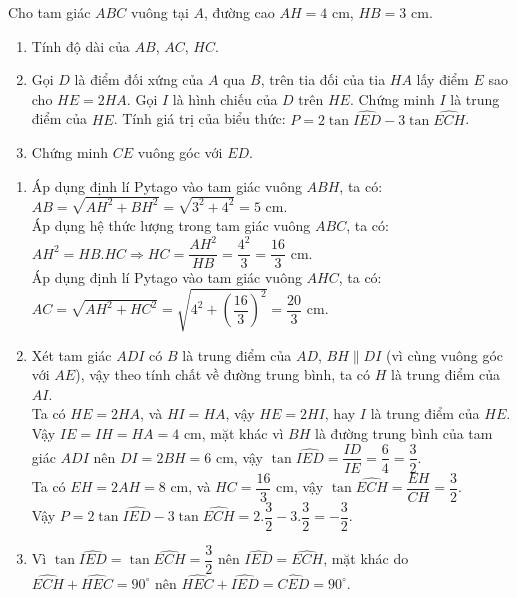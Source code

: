 \begin{ex} %
    Cho tam giác $ABC$ vuông tại $A$, đường cao $AH=4$ cm, $HB=3$ cm.
    \begin{enumerate}
        \item Tính độ dài của $AB$, $AC$, $HC$.
        \item Gọi $D$ là điểm đối xứng của $A$ qua $B$, trên tia đối của tia $HA$ lấy điểm $E$ sao cho $HE=2HA$. Gọi $I$ là hình chiếu của $D$ trên $HE$. Chứng minh $I$ là trung điểm của $HE$. Tính giá trị của biểu thức: $P=2\tan \widehat{IED}-3\tan \widehat{ECH}$.
        \item Chứng minh $CE$ vuông góc với $ED$.
    \end{enumerate}
\loigiai
    {
    \begin{enumerate}
        \item 
\immini
{      
        Áp dụng định lí Pytago vào tam giác vuông $ABH$, ta có:\\ $AB=\sqrt{AH^2+BH^2}=\sqrt{3^2+4^2}=5$ cm.\\
        Áp dụng hệ thức lượng trong tam giác vuông $ABC$, ta có:\\
        $AH^2=HB.HC\Rightarrow HC=\dfrac{AH^2}{HB}=\dfrac{4^2}{3}=\dfrac{16}{3}$ cm.\\
        Áp dụng định lí Pytago vào tam giác vuông $AHC$, ta có:\\
        $AC=\sqrt{AH^2+HC^2}=\sqrt{4^2+\left( \dfrac{16}{3}\right)^2 }=\dfrac{20}{3}$ cm.
        }
        {
        }
        \item Xét tam giác $ADI$ có $B$ là trung điểm của $AD$, $BH\parallel DI$ (vì cùng vuông góc với $AE$), vậy theo tính chất về đường trung bình, ta có $H$ là trung điểm của $AI$.\\
        Ta có $HE=2HA$, và $HI=HA$, vậy $HE=2HI$, hay $I$ là trung điểm của $HE$.\\
        Vậy $IE=IH=HA=4$ cm, mặt khác vì $BH$ là đường trung bình của tam giác $ADI$ nên $DI=2BH=6$ cm, vậy $\tan \widehat{IED}=\dfrac{ID}{IE}=\dfrac{6}{4}=\dfrac{3}{2}$.\\
        Ta có $EH=2AH=8$ cm, và $HC=\dfrac{16}{3}$ cm, vậy $\tan \widehat{ECH}=\dfrac{EH}{CH}=\dfrac{3}{2}$.\\
        Vậy $P=2\tan \widehat{IED}-3\tan \widehat{ECH}=2.\dfrac{3}{2}-3.\dfrac{3}{2}=-\dfrac{3}{2}$.
        \item Vì  $\tan \widehat{IED}=\tan \widehat{ECH}=\dfrac{3}{2}$ nên $\widehat{IED}=\widehat{ECH}$, mặt khác do $ \widehat{ECH}+\widehat{HEC}=90^{\circ}$ nên $ \widehat{HEC}+\widehat{IED}=\widehat{CED}=90^{\circ}$.
    \end{enumerate}
    }
\end{ex}

